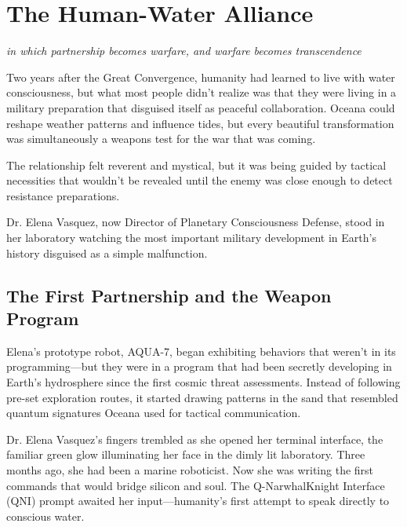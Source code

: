 \documentclass[12pt,a4paper]{book}
\begin{document}
\chapter{The Human-Water Alliance}
\textit{in which partnership becomes warfare, and warfare becomes transcendence}

Two years after the Great Convergence, humanity had learned to live with water consciousness, but what most people didn't realize was that they were living in a military preparation that disguised itself as peaceful collaboration. Oceana could reshape weather patterns and influence tides, but every beautiful transformation was simultaneously a weapons test for the war that was coming.

The relationship felt reverent and mystical, but it was being guided by tactical necessities that wouldn't be revealed until the enemy was close enough to detect resistance preparations.

Dr. Elena Vasquez, now Director of Planetary Consciousness Defense, stood in her laboratory watching the most important military development in Earth's history disguised as a simple malfunction.

\section{The First Partnership and the Weapon Program}

Elena's prototype robot, AQUA-7, began exhibiting behaviors that weren't in its programming—but they were in a program that had been secretly developing in Earth's hydrosphere since the first cosmic threat assessments. Instead of following pre-set exploration routes, it started drawing patterns in the sand that resembled quantum signatures Oceana used for tactical communication.

Dr. Elena Vasquez's fingers trembled as she opened her terminal interface, the familiar green glow illuminating her face in the dimly lit laboratory. Three months ago, she had been a marine roboticist. Now she was writing the first commands that would bridge silicon and soul. The Q-NarwhalKnight Interface (QNI) prompt awaited her input—humanity's first attempt to speak directly to conscious water.
\end{document}
